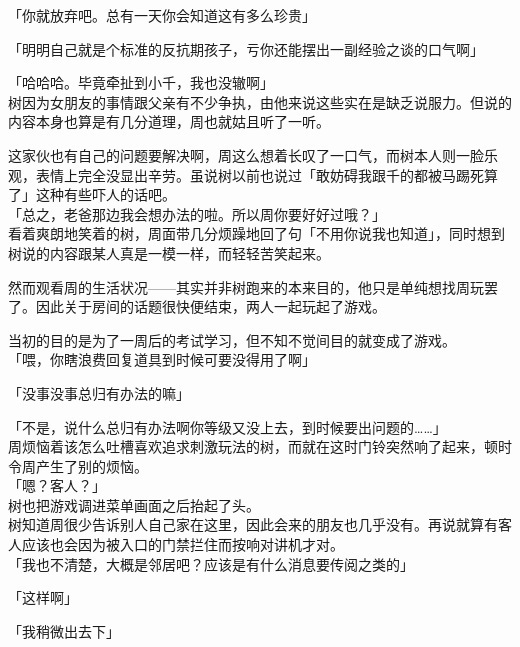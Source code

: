 「你就放弃吧。总有一天你会知道这有多么珍贵」

「明明自己就是个标准的反抗期孩子，亏你还能摆出一副经验之谈的口气啊」

「哈哈哈。毕竟牵扯到小千，我也没辙啊」\\%

树因为女朋友的事情跟父亲有不少争执，由他来说这些实在是缺乏说服力。但说的内容本身也算是有几分道理，周也就姑且听了一听。

这家伙也有自己的问题要解决啊，周这么想着长叹了一口气，而树本人则一脸乐观，表情上完全没显出辛劳。虽说树以前也说过「敢妨碍我跟千的都被马踢死算了」这种有些吓人的话吧。\\

「总之，老爸那边我会想办法的啦。所以周你要好好过哦？」\\

看着爽朗地笑着的树，周面带几分烦躁地回了句「不用你说我也知道」，同时想到树说的内容跟某人真是一模一样，而轻轻苦笑起来。\\

\vspace{2\baselineskip}

然而观看周的生活状况——其实并非树跑来的本来目的，他只是单纯想找周玩罢了。因此关于房间的话题很快便结束，两人一起玩起了游戏。

当初的目的是为了一周后的考试学习，但不知不觉间目的就变成了游戏。\\

「喂，你瞎浪费回复道具到时候可要没得用了啊」

「没事没事总归有办法的嘛」

「不是，说什么总归有办法啊你等级又没上去，到时候要出问题的……」\\

周烦恼着该怎么吐槽喜欢追求刺激玩法的树，而就在这时门铃突然响了起来，顿时令周产生了别的烦恼。\\

「嗯？客人？」\\

树也把游戏调进菜单画面之后抬起了头。\\

树知道周很少告诉别人自己家在这里，因此会来的朋友也几乎没有。再说就算有客人应该也会因为被入口的门禁拦住而按响对讲机才对。\\

「我也不清楚，大概是邻居吧？应该是有什么消息要传阅之类的」

「这样啊」

「我稍微出去下」\\

